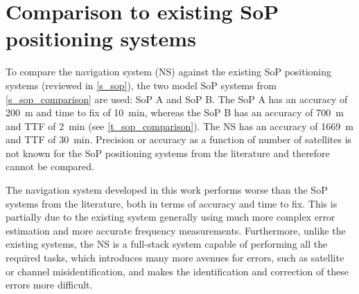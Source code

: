 \section{Comparison to existing SoP positioning systems}
To compare the navigation system (NS) against the existing SoP positioning systems (reviewed in \autoref{s_sop}), the two model SoP systems from \autoref{s_sop_comparison} are used: SoP A and SoP B. The SoP A has an accuracy of \qty{200}{m} and time to fix of \qty{10}{min}, whereas the SoP B has an accuracy of \qty{700}{m} and TTF of \qty{2}{min} (see \autoref{t_sop_comparison}). The NS has an accuracy of \qty{1669}{m} and TTF of \qty{30}{min}. Precision or accuracy as a function of number of satellites is not known for the SoP positioning systems from the literature and therefore cannot be compared.

The navigation system developed in this work performs worse than the SoP systems from the literature, both in terms of accuracy and time to fix. This is partially due to the existing system generally using much more complex error estimation and more accurate frequency measurements. Furthermore, unlike the existing systems, the NS is a full-stack system capable of performing all the required tasks, which introduces many more avenues for errors, such as satellite or channel misidentification, and makes the identification and correction of these errors more difficult.


